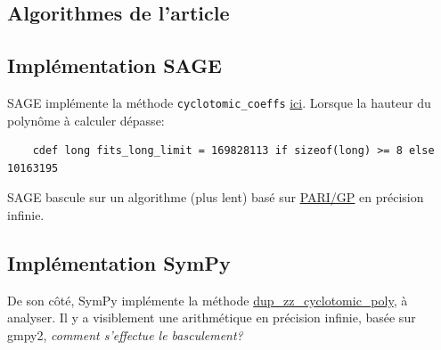 \documentclass{article}
\theoremstyle{break}                  %
\begin{document}
\subsection*{Algorithmes de l'article}

\subsection*{Implémentation SAGE}
SAGE implémente la méthode  \texttt{cyclotomic\_coeffs} \href{https://github.com/sagemath/sage/blob/develop/src/sage/rings/polynomial/cyclotomic.pyx}{ici}. Lorsque la hauteur du polynôme à calculer dépasse:
\begin{verbatim}
	cdef long fits_long_limit = 169828113 if sizeof(long) >= 8 else 10163195
\end{verbatim}
SAGE bascule sur un algorithme (plus lent) basé sur \href{https://pari.math.u-bordeaux.fr/}{PARI/GP} en précision infinie.

\subsection*{Implémentation SymPy}
De son côté, SymPy implémente la méthode \href{https://docs.sympy.org/latest/modules/polys/internals.html#sympy.polys.factortools.dup_zz_cyclotomic_poly}{dup\_zz\_cyclotomic\_poly}, à analyser. Il y a visiblement une arithmétique en précision infinie, basée sur gmpy2, \textit{comment s'effectue le basculement?}
\end{document}
